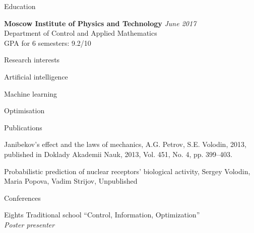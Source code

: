 \documentclass{resume} %
\begin{document}

\begin{rSection}{Education}

{\bf Moscow Institute of Physics and Technology} \hfill {\em June 2017} \\ 
Department of Control and Applied Mathematics\\
GPA for 6 semesters: 9.2/10

\end{rSection}


\begin{rSection}{Research interests}
	\item Artificial intelligence
	\item Machine learning
	\item Optimisation

\end{rSection}


\begin{rSection}{Publications}
	\item Janibekov’s effect and the laws of mechanics, A.G. Petrov, S.E. Volodin, 2013, published in Doklady Akademii Nauk, 2013, Vol. 451, No. 4, pp. 399–403.
	
	\item Probabilistic prediction of nuclear receptors’ biological activity, Sergey Volodin, Maria Popova, Vadim Strijov, Unpublished
	
\end{rSection}

\begin{rSection}{Conferences}
\item Eights Traditional school “Control, Information, Optimization”\\
{\em Poster presenter}
\end{rSection}
\end{document}
